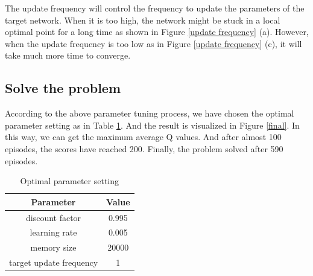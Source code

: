 \documentclass{article}
\begin{document}
The update frequency will control the frequency to update the parameters of the target network.
When it is too high, the network might be stuck in a local optimal point for a long time as shown in
Figure \ref{update frequency} (a). However, when the update frequency is too low as in Figure \ref{update frequency}
(c), it will take much more time to converge.

\subsection{Solve the problem}

According to the above parameter tuning process, we have chosen the optimal parameter setting as in
Table \ref{param table}. And the result is visualized in Figure \ref{final}. In this way, we can get
the maximum average Q values. And after almost 100 episodes, the scores have reached 200.
Finally, the problem solved after 590 episodes.

\begin{table}[H]
  \centering
  \begin{tabular}{cc}
  \hline\hline
  Parameter& Value\\
  \hline\hline
  discount factor & 0.995\\
  learning rate & 0.005\\
  memory size & 20000\\
  target update frequency & 1\\
  \hline
  \end{tabular}
  \caption{Optimal parameter setting}
  \label{param table}
\end{table}
\end{document}
